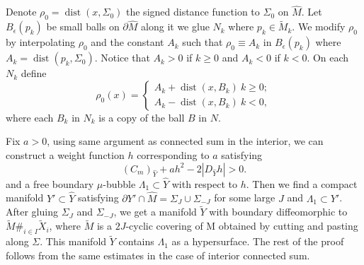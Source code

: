 \documentclass[11pt,letterpaper]{amsart}
\theoremstyle{definition}
\theoremstyle{remark}
\numberwithin{equation}{section}
\begin{document}
Denote $\rho_0=\operatorname{dist}(x,\Sigma_0)$ the signed distance function to $\Sigma_0$ on $\hat{M}$. Let $B_\epsilon(p_k)$ be small balls on $\partial \hat{M}$ along it we glue $N_k$ where $p_k\in \tilde{M}_k$. We modify $\rho_0$ by interpolating $\rho_0$ and the constant $A_k$ such that $\rho_0\equiv A_k$ in $B_{\epsilon}(p_k)$ where $A_k=\operatorname{dist}(p_k,\Sigma_0)$. Notice that $A_k> 0$ if $k\geq0$ and $A_k< 0$ if $k<0$. On each $N_k$ define
\[\rho_0(x)=\begin{cases}
    A_k+\operatorname{dist}(x,B_{k})\ k\geq 0;\\
    A_k-\operatorname{dist}(x,B_{k}) \ k<0,
\end{cases}\]
where each $B_{k}$ in $N_{k}$ is a copy of the ball $B$ in $N$. 

Fix $a>0$, using same argument as connected sum in the interior, we can construct a weight function $h$ corresponding to $a$ satisfying 
\begin{equation}\label{equ about h boundary}
(C_{m})_{\hat{Y}}+a h^2-2|D_{\hat{Y}}h|>0.
\end{equation}
and a free boundary $\mu$-bubble $\Lambda_{1}\subset \hat{Y}$ with respect to $h$. Then we find a compact manifold $Y'\subset \hat{Y}$ satisfying $\partial Y' \cap \hat{M} = \Sigma_{J}\cup \Sigma_{-J}$ for some large $J$ and $\Lambda_{1}\subset Y'$. After gluing $\Sigma_{J}$ and $\Sigma_{-J}$, we get a manifold $\tilde{Y}$ with boundary diffeomorphic to $\tilde{M} \#_{i\in I} \tilde{X}_{i}$, where $\tilde{M}$ is a $2J$-cyclic covering of M
obtained by cutting and pasting along $\Sigma$. This manifold $\tilde{Y}$ contains $\Lambda_1$ as a hypersurface. The rest of the proof follows from the same estimates in the case of interior connected sum.




\end{document}
